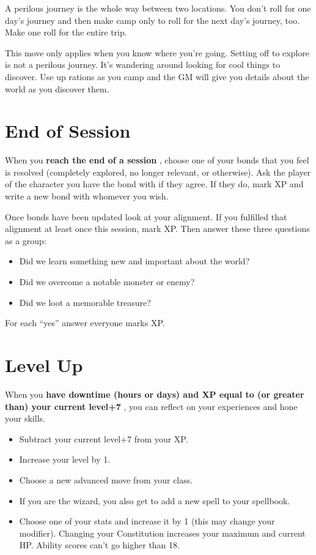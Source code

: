  A perilous journey is the whole way between two locations. You don't roll for one day's journey and then make camp only to roll for the next day's journey, too. Make one roll for the entire trip.


 This move only applies when you know where you're going. Setting off to explore is not a perilous journey. It's wandering around looking for cool things to discover. Use up rations as you camp and the GM will give you details about the world as you discover them.
\section*{End of Session}
\HRule
 When you \textbf{reach the end of a session}
, choose one of your bonds that you feel is resolved (completely explored, no longer relevant, or otherwise). Ask the player of the character you have the bond with if they agree. If they do, mark XP and write a new bond with whomever you wish.


 Once bonds have been updated look at your alignment. If you fulfilled that alignment at least once this session, mark XP\@. Then answer these three questions as a group:
\begin{itemize}
\item Did we learn something new and important about the world?
\item Did we overcome a notable monster or enemy?
\item Did we loot a memorable treasure?
\end{itemize}
\HRule

 For each ``yes'' answer everyone marks XP\@.
\section*{Level Up}
\HRule
 When you \textbf{have downtime (hours or days) and XP equal to (or greater than) your current level+7}
, you can reflect on your experiences and hone your skills.
\begin{itemize}
\item Subtract your current level+7 from your XP\@.
\item Increase your level by 1.
\item Choose a new advanced move from your class.
\item If you are the wizard, you also get to add a new spell to your spellbook.
\item Choose one of your stats and increase it by 1 (this may change your modifier). Changing your Constitution increases your maximum and current HP\@. Ability scores can't go higher than 18.
\end{itemize}
\HRule
